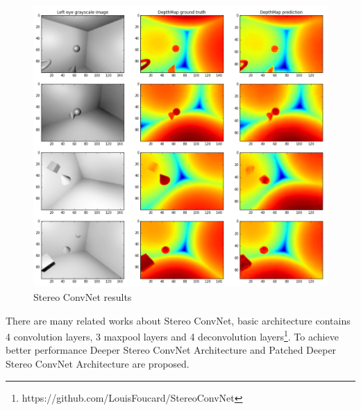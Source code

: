 \begin{figure}[h!]
	\centering
	\includegraphics[width=0.8\linewidth]{figures/part3/stereo_connet.pdf}
	\caption{Stereo ConvNet results}
	\label{fig:stereo_connet}
\end{figure} 

 There are many related works about Stereo ConvNet, basic architecture contains 4 convolution layers, 3 maxpool layers and 4 deconvolution layers\footnote{https://github.com/LouisFoucard/StereoConvNet}. To achieve better performance Deeper Stereo ConvNet Architecture \cite{Dosovitskiy2015FlowNet} and  Patched Deeper Stereo ConvNet Architecture \cite{7298715}\cite{Lecun2015Stereo} are proposed.
